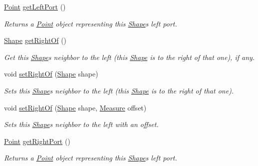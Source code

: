 \begin{DoxyCompactItemize}
\hyperlink{classcom_1_1aarrelaakso_1_1drawl_1_1_point}{Point} \hyperlink{classcom_1_1aarrelaakso_1_1drawl_1_1_shape_aeffa96786ca552adf46924ec77da9555}{get\+Left\+Port} ()
\begin{DoxyCompactList}\small\item\em Returns a \hyperlink{classcom_1_1aarrelaakso_1_1drawl_1_1_point}{Point} object representing this \hyperlink{classcom_1_1aarrelaakso_1_1drawl_1_1_shape}{Shape}\textquotesingle{}s left port. \end{DoxyCompactList}\item 
\hyperlink{classcom_1_1aarrelaakso_1_1drawl_1_1_shape}{Shape} \hyperlink{classcom_1_1aarrelaakso_1_1drawl_1_1_shape_a1ad573b06f341aa79f6a255a476ae6e4}{get\+Right\+Of} ()
\begin{DoxyCompactList}\small\item\em Get this \hyperlink{classcom_1_1aarrelaakso_1_1drawl_1_1_shape}{Shape}\textquotesingle{}s neighbor to the left (this \hyperlink{classcom_1_1aarrelaakso_1_1drawl_1_1_shape}{Shape} is to the right of that one), if any. \end{DoxyCompactList}\item 
void \hyperlink{classcom_1_1aarrelaakso_1_1drawl_1_1_shape_a09e1586ce85c1d964cc3b7ce94bc5d4c}{set\+Right\+Of} (\hyperlink{classcom_1_1aarrelaakso_1_1drawl_1_1_shape}{Shape} shape)
\begin{DoxyCompactList}\small\item\em Sets this \hyperlink{classcom_1_1aarrelaakso_1_1drawl_1_1_shape}{Shape}\textquotesingle{}s neighbor to the left (this \hyperlink{classcom_1_1aarrelaakso_1_1drawl_1_1_shape}{Shape} is to the right of that one). \end{DoxyCompactList}\item 
void \hyperlink{classcom_1_1aarrelaakso_1_1drawl_1_1_shape_a5bdc7b20e5863cf6c83a8abe57ce1399}{set\+Right\+Of} (\hyperlink{classcom_1_1aarrelaakso_1_1drawl_1_1_shape}{Shape} shape, \hyperlink{classcom_1_1aarrelaakso_1_1drawl_1_1_measure}{Measure} offset)
\begin{DoxyCompactList}\small\item\em Sets this \hyperlink{classcom_1_1aarrelaakso_1_1drawl_1_1_shape}{Shape}\textquotesingle{}s neighbor to the left with an offset. \end{DoxyCompactList}\item 
\hyperlink{classcom_1_1aarrelaakso_1_1drawl_1_1_point}{Point} \hyperlink{classcom_1_1aarrelaakso_1_1drawl_1_1_shape_a319c78d425ec91e1aef1072a95e349ad}{get\+Right\+Port} ()
\begin{DoxyCompactList}\small\item\em Returns a \hyperlink{classcom_1_1aarrelaakso_1_1drawl_1_1_point}{Point} object representing this \hyperlink{classcom_1_1aarrelaakso_1_1drawl_1_1_shape}{Shape}\textquotesingle{}s left port. \end{DoxyCompactList}\item 

\end{DoxyCompactItemize}
